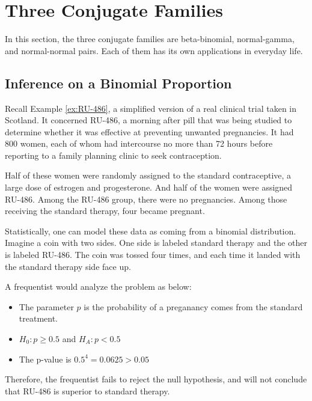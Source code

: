 \documentclass[]{book}
\theoremstyle{definition}
\theoremstyle{definition}
\theoremstyle{definition}
\theoremstyle{remark}
\let\BeginKnitrBlock\begin \let\EndKnitrBlock\end
\begin{document}
\section{Three Conjugate Families}\label{three-conjugate-families}

In this section, the three conjugate families are beta-binomial,
normal-gamma, and normal-normal pairs. Each of them has its own
applications in everyday life.

\subsection{Inference on a Binomial
Proportion}\label{inference-on-a-binomial-proportion}

\BeginKnitrBlock{example}
\protect\hypertarget{exm:RU-486more}{}{\label{exm:RU-486more} }Recall
Example \ref{ex:RU-486}, a simplified version of a real clinical trial
taken in Scotland. It concerned RU-486, a morning after pill that was
being studied to determine whether it was effective at preventing
unwanted pregnancies. It had 800 women, each of whom had intercourse no
more than 72 hours before reporting to a family planning clinic to seek
contraception.

Half of these women were randomly assigned to the standard
contraceptive, a large dose of estrogen and progesterone. And half of
the women were assigned RU-486. Among the RU-486 group, there were no
pregnancies. Among those receiving the standard therapy, four became
pregnant.
\EndKnitrBlock{example}

Statistically, one can model these data as coming from a binomial
distribution. Imagine a coin with two sides. One side is labeled
standard therapy and the other is labeled RU-486. The coin was tossed
four times, and each time it landed with the standard therapy side face
up.

A frequentist would analyze the problem as below:

\begin{itemize}
\item
  The parameter \(p\) is the probability of a preganancy comes from the
  standard treatment.
\item
  \(H_0: p \geq 0.5\) and \(H_A: p < 0.5\)
\item
  The p-value is \(0.5^4 = 0.0625 > 0.05\)
\end{itemize}

Therefore, the frequentist fails to reject the null hypothesis, and will
not conclude that RU-486 is superior to standard therapy.
\end{document}
